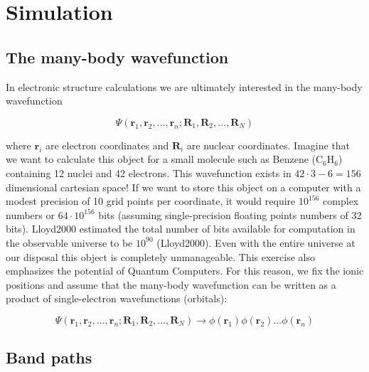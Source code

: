 \chapter{Simulation}

\section{The many-body wavefunction}
In electronic structure calculations we are ultimately interested in the many-body wavefunction

\[ \Psi(\bm{r}_1,\bm{r}_2,\dots, \bm{r}_n; \bm{R}_1, \bm{R}_2, \dots , \bm{R}_N) \]

\noindent where $\bm{r}_i$ are electron coordinates and $\bm{R}_i$ are nuclear coordinates. Imagine that we want to calculate this object for a small molecule such as Benzene (C$_6$H$_6$) containing 12 nuclei and 42 electrons. This wavefunction exists in $42\cdot3-6 = 156$ dimensional cartesian space! If we want to store this object on a computer with a modest precision of 10 grid points per coordinate, it would require $10^{156}$ complex numbers or $64 \cdot 10^{156}$ bits (assuming single-precision floating points numbers of 32 bits). Lloyd2000 estimated the total number of bits available for computation in the observable universe to be $10^{90}$ (Lloyd2000). Even with the entire universe at our disposal this object is completely unmanageable. This exercise also emphasizes the potential of Quantum Computers. For this reason, we fix the ionic positions and assume that the many-body wavefunction can be written as a product of single-electron wavefunctions (orbitals):

\[ \Psi(\bm{r}_1,\bm{r}_2,\dots, \bm{r}_n; \bm{R}_1, \bm{R}_2, \dots , \bm{R}_N) \longrightarrow \phi(\bm{r}_1)\phi(\bm{r}_2)\dots\phi(\bm{r}_n) \]

\section{Band paths}


